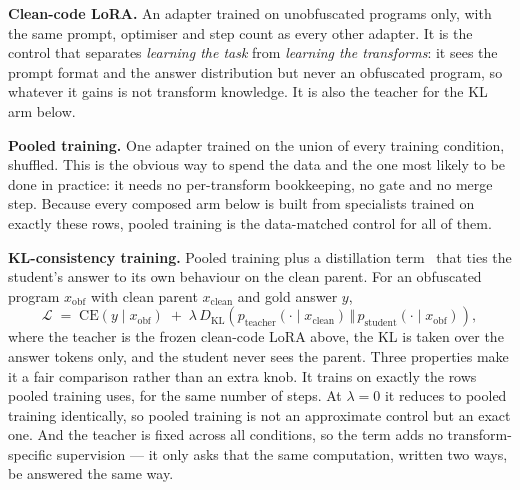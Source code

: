 \noindent\textbf{Clean-code LoRA.} An adapter trained on unobfuscated programs only, with the same
prompt, optimiser and step count as every other adapter. It is the control that separates
\emph{learning the task} from \emph{learning the transforms}: it sees the prompt format and the answer
distribution but never an obfuscated program, so whatever it gains is not transform knowledge. It is
also the teacher for the KL arm below.

\noindent\textbf{Pooled training.} One adapter trained on the union of every training condition,
shuffled. This is the obvious way to spend the data and the one most likely to be done in practice: it
needs no per-transform bookkeeping, no gate and no merge step. Because every composed arm below is
built from specialists trained on exactly these rows, pooled training is the data-matched control for
all of them.

\noindent\textbf{KL-consistency training.} Pooled training plus a distillation
term~\cite{distillation} that ties the student's answer to its own behaviour on the clean parent. For
an obfuscated program $x_{\mathrm{obf}}$ with clean parent $x_{\mathrm{clean}}$ and gold answer $y$,
%
\begin{equation}
\mathcal{L} \;=\; \mathrm{CE}\!\left(y \mid x_{\mathrm{obf}}\right)
\;+\; \lambda\, D_{\mathrm{KL}}\!\left(
p_{\mathrm{teacher}}(\cdot \mid x_{\mathrm{clean}}) \,\Vert\,
p_{\mathrm{student}}(\cdot \mid x_{\mathrm{obf}}) \right),
\label{eq:kl}
\end{equation}
%
where the teacher is the frozen clean-code LoRA above, the KL is taken over the answer tokens only,
and the student never sees the parent. Three properties make it a fair comparison rather than an extra
knob. It trains on exactly the rows pooled training uses, for the same number of steps. At
$\lambda = 0$ it reduces to pooled training identically, so pooled training is not an approximate
control but an exact one. And the teacher is fixed across all conditions, so the term adds no
transform-specific supervision --- it only asks that the same computation, written two ways, be
answered the same way.

